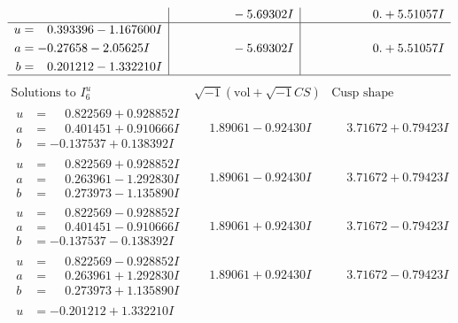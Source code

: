 \documentclass[1p]{elsarticle_modified}
\theoremstyle{definition}
\newcommand{\I}{\sqrt{-1}}
\begin{document}
$$\begin{array}{c|c|c}
 & \phantom{-0.000000 } -5.69302 I & \phantom{-0.000000 -}0. + 5.51057 I \\ \hline\begin{aligned}
u &= \phantom{-}0.393396 - 1.167600 I \\
a &= -0.27658 - 2.05625 I \\
b &= \phantom{-}0.201212 - 1.332210 I\end{aligned}
 & \phantom{-0.000000 } -5.69302 I & \phantom{-0.000000 -}0. + 5.51057 I\\
 \hline 
 \end{array}$$\newpage$$\begin{array}{c|c|c}  
\text{Solutions to }I^u_{6}& \I (\text{vol} + \sqrt{-1}CS) & \text{Cusp shape}\\
 \hline 
\begin{aligned}
u &= \phantom{-}0.822569 + 0.928852 I \\
a &= \phantom{-}0.401451 + 0.910666 I \\
b &= -0.137537 + 0.138392 I\end{aligned}
 & \phantom{-}1.89061 - 0.92430 I & \phantom{-}3.71672 + 0.79423 I \\ \hline\begin{aligned}
u &= \phantom{-}0.822569 + 0.928852 I \\
a &= \phantom{-}0.263961 - 1.292830 I \\
b &= \phantom{-}0.273973 - 1.135890 I\end{aligned}
 & \phantom{-}1.89061 - 0.92430 I & \phantom{-}3.71672 + 0.79423 I \\ \hline\begin{aligned}
u &= \phantom{-}0.822569 - 0.928852 I \\
a &= \phantom{-}0.401451 - 0.910666 I \\
b &= -0.137537 - 0.138392 I\end{aligned}
 & \phantom{-}1.89061 + 0.92430 I & \phantom{-}3.71672 - 0.79423 I \\ \hline\begin{aligned}
u &= \phantom{-}0.822569 - 0.928852 I \\
a &= \phantom{-}0.263961 + 1.292830 I \\
b &= \phantom{-}0.273973 + 1.135890 I\end{aligned}
 & \phantom{-}1.89061 + 0.92430 I & \phantom{-}3.71672 - 0.79423 I \\ \hline\begin{aligned}
u &= -0.201212 + 1.332210 I \\

\end{aligned}
\end{array}$$
\end{document}

